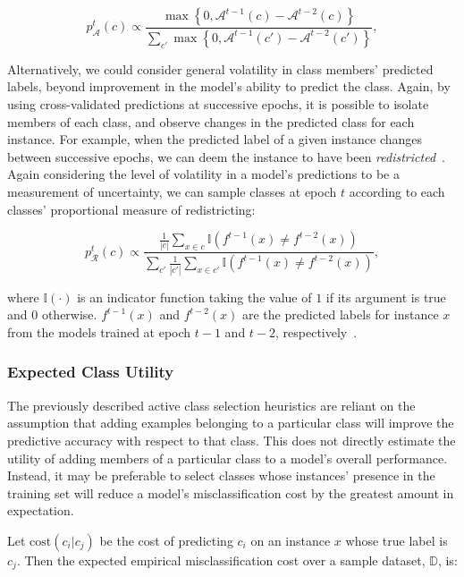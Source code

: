  $$p^t_{\mathcal{A}}(c) \propto \frac{\max \left\{ 0,\mathcal{A}^{t-1}(c) - \mathcal{A}^{t-2}(c) \right\}}{\sum_{c'} \max \left\{ 0,\mathcal{A}^{t-1}(c') - \mathcal{A}^{t-2}(c') \right\}},$$

Alternatively, we could consider general volatility in class members' predicted labels, beyond improvement in the model's ability to predict the class. Again, by using cross-validated predictions at successive epochs, it is possible to isolate members of each class, and observe changes in the predicted class for each instance. For example, when the predicted label of a given instance changes between successive epochs, we can deem the instance to have been \emph{redistricted}~\cite{lomasky:ecml2007, lomaskyThesis, lomasky:nose2006}. Again considering the level of volatility in a model's predictions to be a measurement of uncertainty, we can sample classes at epoch $t$ according to each classes' proportional measure of redistricting:

$$p^t_{\mathcal{R}}(c) \propto \frac{\frac{1}{|c|}\sum_{x \in c} \mathbb{I}(f^{t-1}(x) \ne f^{t-2}(x))  }{\sum_{c'} \frac{1}{|c'|}\sum_{x \in c'} \mathbb{I}(f^{t-1}(x) \ne f^{t-2}(x)) },$$

\noindent where $\mathbb{I}(\cdot)$ is an indicator function taking the value of $1$ if its argument is true and $0$ otherwise. $f^{t-1}(x)$ and $f^{t-2}(x)$ are the predicted labels for instance $x$ from the models trained at epoch $t-1$ and $t-2$, respectively~\cite{lomasky:ecml2007, lomaskyThesis, lomasky:nose2006}.\\

\subsubsection{Expected Class Utility}
The previously described active class selection heuristics are reliant on the assumption that adding examples belonging to a particular class will improve the predictive accuracy with respect to that class. This does not directly estimate the utility of adding members of a particular class to a model's overall performance. Instead, it may be preferable to select classes whose instances' presence in the training set will reduce a model's misclassification cost by the greatest amount in expectation.

Let $\mbox{cost}(c_i | c_j)$ be the cost of predicting $c_i$ on an instance $x$ whose true label is $c_j$. Then the expected empirical misclassification cost over a sample dataset, $\mathbb{D}$, is:

